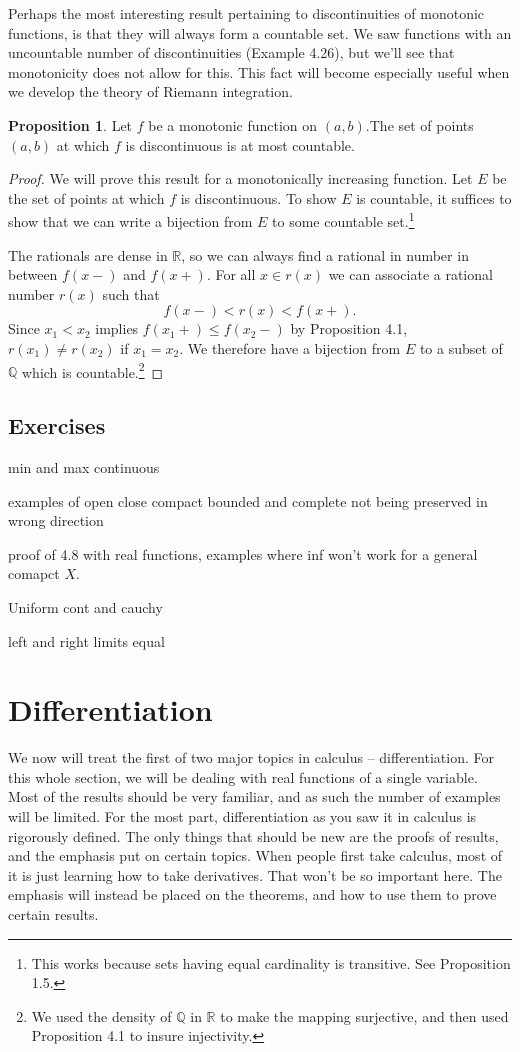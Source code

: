 \documentclass{article}
\newcommand{\R}{\mathbb{R}}
\newcommand{\Q}{\mathbb{Q}}
\theoremstyle{definition}
\newtheorem{proposition}{Proposition}[section]
\begin{document}
	Perhaps the most interesting result pertaining to discontinuities of monotonic functions, is that they will always form a countable set. We saw functions with an uncountable number of discontinuities (Example 4.26), but we'll see that monotonicity does not allow for this. This fact will become especially useful when we develop the theory of Riemann integration.
	\begin{proposition}
		Let $ f $ be a monotonic function on $ (a,b) $.The set of points $ (a,b) $ at which $ f $ is discontinuous is at most countable. 
	\end{proposition}
	\begin{proof}
		We will prove this result for a monotonically increasing function. Let $ E $ be the set of points at which $ f $ is discontinuous. To show $ E $ is countable, it suffices to show that we can write a bijection from $ E $ to some countable set.\footnote{This works because sets having equal cardinality is transitive. See Proposition 1.5.}
		
		The rationals are dense in $ \R $, so we can always find a rational in number in between $ f(x-) $ and $ f(x+) $. For all $ x\in r(x) $ we can associate a rational number $ r(x) $ such that $$  f(x-)<r(x)<f(x+).$$ Since $ x_1<x_2 $ implies $ f(x_1+)\le f(x_2-)  $ by Proposition 4.1, $ r(x_1)\neq r(x_2) $ if $ x_1=x_2 $. We therefore have a bijection from $ E $ to a subset of $ \Q $ which is countable.\footnote{We used the density of $ \Q $ in $ \R $ to make the mapping surjective, and then used Proposition 4.1 to insure injectivity.}
	\end{proof}
	\subsection{Exercises}
	min and max continuous
	
	examples of open close compact bounded and complete not being preserved in wrong direction
	
	proof of 4.8 with real functions, examples where inf won't work for a general comapct $ X $. 
	
	Uniform cont and cauchy
	
	left and right limits equal
	\newpage
	\section{Differentiation}
	We now will treat the first of two major topics in calculus -- differentiation. For this whole section, we will be dealing with real functions of a single variable. Most of the results should be very familiar, and as such the number of examples will be limited. For the most part, differentiation as you saw it in calculus is rigorously defined. The only things that should be new are the proofs of results, and the emphasis put on certain topics. When people first take calculus, most of it is just learning how to take derivatives. That won't be so important here. The emphasis will instead be placed on the theorems, and how to use them to prove certain results.    
\end{document}
